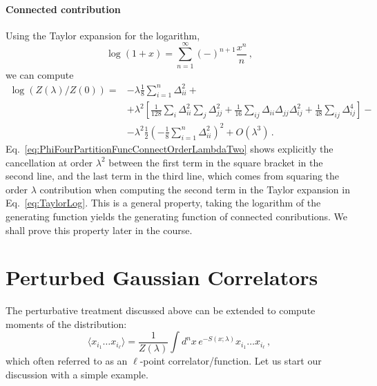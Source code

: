 \documentclass[notes.tex]{subfiles}
\begin{document}
\paragraph{Connected contribution}

Using the Taylor expansion for the logarithm,
\begin{equation}
  \label{eq:TaylorLog}
  \log(1+x) = \sum_{n=1}^\infty (-)^{n+1} \frac{x^n}{n}\, ,
\end{equation}
we can compute
\begin{align}
  \label{eq:PhiFourPartitionFuncConnectOrderLambdaTwo}
  \log\left(Z(\lambda)/Z(0)\right) = 
                    &- \lambda \frac{1}{8} \sum_{i=1}^n \Delta_{ii}^2
                                     +\nonumber \\
                     &+\lambda^2
                    \left[
                    \frac{1}{128} \sum_i \Delta_{ii}^2 \sum_j \Delta_{jj}^2 +
                    \frac{1}{16} \sum_{ij} \Delta_{ii} \Delta_{jj} \Delta_{ij}^2 +
                    \frac{1}{48} \sum_{ij} \Delta_{ij}^4
                    \right] -  \nonumber \\
  &- \lambda^2 \frac{1}{2} \left( - \frac{1}{8}
    \sum_{i=1}^n \Delta_{ii}^2\right)^2 +  O(\lambda^3)\, . 
\end{align}
Eq.~\ref{eq:PhiFourPartitionFuncConnectOrderLambdaTwo} shows
explicitly the cancellation at order $\lambda^2$ between the first
term in the square bracket in the second line, and the last term in
the third line, which comes from squaring the order $\lambda$
contribution when computing the second term in the Taylor expansion in
Eq.~\ref{eq:TaylorLog}. This is a general property, taking the
logarithm of the generating function yields the generating function of
connected conributions. We shall prove this property later in the
course. 

\section{Perturbed Gaussian Correlators}
\label{sec:pert-gauss-corr}

The perturbative treatment discussed above can be extended to compute
moments of the distribution:
\begin{equation}
  \label{eq:lPointCorrPert}
  \langle x_{i_1} \ldots x_{i_\ell}\rangle =
  \frac{1}{Z(\lambda)} 
  \int d^nx\, e^{-S(x;\lambda)} x_{i_1} \ldots x_{i_\ell}\, ,
\end{equation}
which often referred to as an $\ell$-point correlator/function. Let us start
our discussion with a simple example. 
\end{document}

